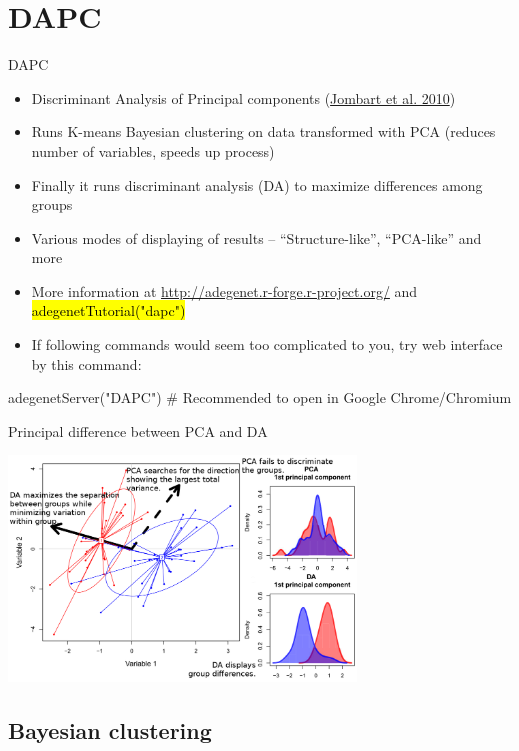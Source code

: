 \documentclass[compress, ucs, xelatex, 11pt, xcolor=svgnames,
  hyperref={
    bookmarks=true,
    unicode=true,
    colorlinks=true,
    pdftitle={Molecular data in R},
    plainpages=false,
    pdfauthor={Vojtech Zeisek},
    pdfsubject={Course about phylogeny and evolution in R},
    pdfcreator={XeLaTeX},
    pdfkeywords={R, evolution, phylogeny, molecular data},
    linkcolor=Tomato,
    anchorcolor=SaddleBrown,
    citecolor=Goldenrod,
    filecolor=DarkMagenta,
    menucolor=Sienna,
    urlcolor=DarkTurquoise,
    pdftex},
  url={hyphens, lowtilde} %
  ]{beamer}
\renewcommand{\texttt}[1]{\hl{\ttfamily #1}}
\begin{document}
\section{DAPC}

\begin{frame}[fragile]{DAPC}
  \begin{itemize}
    \item Discriminant Analysis of Principal components (\href{http://bmcgenet.biomedcentral.com/articles/10.1186/1471-2156-11-94}{Jombart et al. 2010})
    \item Runs K-means Bayesian clustering on data transformed with PCA (reduces number of variables, speeds up process)
    \item Finally it runs discriminant analysis (DA) to maximize differences among groups
    \item Various modes of displaying of results -- ``Structure-like'', ``PCA-like'' and more
    \item More information at \url{http://adegenet.r-forge.r-project.org/} and \texttt{adegenetTutorial("dapc")}
    \item If following commands would seem too complicated to you, try web interface by this command:
  \end{itemize}
  \begin{spluscode}
    adegenetServer("DAPC") # Recommended to open in Google Chrome/Chromium
  \end{spluscode}
\end{frame}

\begin{frame}{Principal difference between PCA and DA}
\begin{center}
  \includegraphics[height=6cm]{dapc-da-pca.png}
\end{center}
\end{frame}

\subsection{Bayesian clustering}
\end{document}
